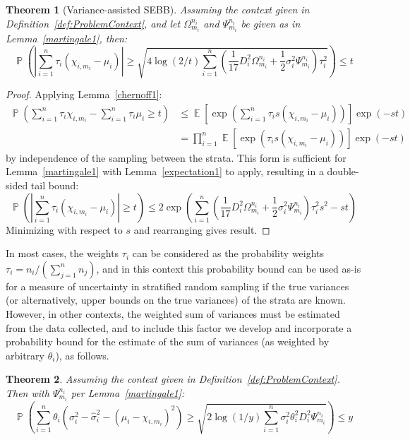 \documentclass[]{interact}
\DeclareMathOperator{\E}{\mathbb{E}}
\DeclareMathOperator{\pr}{\mathbb{P}}
\theoremstyle{plain}%
\newtheorem{Theorem}{Theorem}[section]
\theoremstyle{definition}
\theoremstyle{remark}
\begin{document}
\begin{Theorem}[Variance-assisted SEBB]\label{thm:1}
Assuming the context given in Definition~\ref{def:ProblemContext}, and let $\Omega_{m_i}^{n_i}$ and $\Psi_{m_i}^{n_i}$ be given as in Lemma~\ref{martingale1}, then:
\begin{equation}\label{eq1} \pr\left(\left|\sum_{i=1}^n\tau_i(\chi_{i,m_i}-\mu_i)\right|\ge \sqrt{4\log(2/t)\sum_{i=1}^n\left(\frac{1}{17}D_i^2\Omega_{m_i}^{n_i}+\frac{1}{2}\sigma_i^2\Psi_{m_i}^{n_i}\right)\tau_i^2}\right)\le t \end{equation}
\end{Theorem}
\begin{proof}
Applying Lemma~\ref{chernoff1}:
\begin{align*} \pr\left(\sum_{i=1}^n\tau_i\chi_{i,m_i}-\sum_{i=1}^n\tau_i\mu_i\ge t\right)
&\le\E\left[\exp\left(\sum_{i=1}^n\tau_is\left(\chi_{i,m_i}-\mu_i\right)\right)\right]\exp(-st)\\
&= \prod_{i=1}^n\E\left[\exp\left(\tau_is\left(\chi_{i,m_i}-\mu_i\right)\right)\right]\exp(-st) 
\end{align*}
by independence of the sampling between the strata. 
This form is sufficient for Lemma~\ref{martingale1} with Lemma~\ref{expectation1} to apply, resulting in a double-sided tail bound:
$$ \pr\left(\left|\sum_{i=1}^n\tau_i(\chi_{i,m_i}-\mu_i)\right|\ge t\right)\le 2\exp\left(\sum_{i=1}^n\left(\frac{1}{17}D_i^2\Omega_{m_i}^{n_i}+\frac{1}{2}\sigma_i^2\Psi_{m_i}^{n_i}\right)\tau_i^2s^2 - st\right) $$
Minimizing with respect to $s$ and rearranging gives result.
\end{proof}

In most cases, the weights $\tau_i$ can be considered as the probability weights $\tau_i=n_i/(\sum_{j=1}^nn_j)$, 
and in this context this probability bound can be used as-is for a measure of uncertainty in stratified random sampling if the true variances (or alternatively, upper bounds on the true variances) of the strata are known. 
However, in other contexts, the weighted sum of variances must be estimated from the data collected, and to include this factor we develop and incorporate a probability bound for the estimate of the sum of variances (as weighted by arbitrary $\theta_i$), as follows. 


\begin{Theorem}\label{thm:2}
Assuming the context given in Definition~\ref{def:ProblemContext}.
Then with $\Psi_{m_i}^{n_i}$ per Lemma~\ref{martingale1}:
\begin{equation}\label{eq2} \pr\left(\sum_{i=1}^n\theta_i(\sigma_i^2-\hat{\sigma}_i^2 - (\mu_i - \chi_{i,m_i})^2)\ge \sqrt{2\log(1/y)\sum_{i=1}^n\sigma_i^2\theta_i^2D_i^2\Psi_{m_i}^{n_i}}\right) \le y \end{equation}
\end{Theorem}
\end{document}
